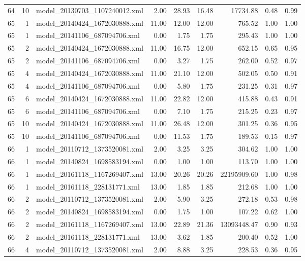 \begin{table}[ht]
\begin{tabular}{rrlrrrrrr}
   64 &  10 & model\_20130703\_1107240012.xml & 2.00 & 28.93 & 16.48 & 17734.88 & 0.48 & 0.99 \\ 
   65 &   1 & model\_20140424\_1672030888.xml & 11.00 & 12.00 & 12.00 & 765.52 & 1.00 & 1.00 \\ 
   65 &   1 & model\_20141106\_687094706.xml & 0.00 & 1.75 & 1.75 & 295.43 & 1.00 & 1.00 \\ 
   65 &   2 & model\_20140424\_1672030888.xml & 11.00 & 16.75 & 12.00 & 652.15 & 0.65 & 0.95 \\ 
   65 &   2 & model\_20141106\_687094706.xml & 0.00 & 3.27 & 1.75 & 262.00 & 0.52 & 0.97 \\ 
   65 &   4 & model\_20140424\_1672030888.xml & 11.00 & 21.10 & 12.00 & 502.05 & 0.50 & 0.91 \\ 
   65 &   4 & model\_20141106\_687094706.xml & 0.00 & 5.80 & 1.75 & 231.25 & 0.31 & 0.97 \\ 
   65 &   6 & model\_20140424\_1672030888.xml & 11.00 & 22.82 & 12.00 & 415.88 & 0.43 & 0.91 \\ 
   65 &   6 & model\_20141106\_687094706.xml & 0.00 & 7.10 & 1.75 & 215.25 & 0.23 & 0.97 \\ 
   65 &  10 & model\_20140424\_1672030888.xml & 11.00 & 26.48 & 12.00 & 301.25 & 0.36 & 0.95 \\ 
   65 &  10 & model\_20141106\_687094706.xml & 0.00 & 11.53 & 1.75 & 189.53 & 0.15 & 0.97 \\ 
   66 &   1 & model\_20110712\_1373520081.xml & 2.00 & 3.25 & 3.25 & 304.62 & 1.00 & 1.00 \\ 
   66 &   1 & model\_20140824\_1698583194.xml & 0.00 & 1.00 & 1.00 & 113.70 & 1.00 & 1.00 \\ 
   66 &   1 & model\_20161118\_1167269407.xml & 13.00 & 20.26 & 20.26 & 22195909.60 & 1.00 & 0.98 \\ 
   66 &   1 & model\_20161118\_228131771.xml & 13.00 & 1.85 & 1.85 & 212.68 & 1.00 & 1.00 \\ 
   66 &   2 & model\_20110712\_1373520081.xml & 2.00 & 5.90 & 3.25 & 272.18 & 0.53 & 0.98 \\ 
   66 &   2 & model\_20140824\_1698583194.xml & 0.00 & 1.75 & 1.00 & 107.22 & 0.62 & 1.00 \\ 
   66 &   2 & model\_20161118\_1167269407.xml & 13.00 & 22.89 & 21.36 & 13093448.47 & 0.90 & 0.93 \\ 
   66 &   2 & model\_20161118\_228131771.xml & 13.00 & 3.62 & 1.85 & 200.40 & 0.52 & 1.00 \\ 
   66 &   4 & model\_20110712\_1373520081.xml & 2.00 & 8.88 & 3.25 & 228.53 & 0.36 & 0.95 \\ 

\end{tabular}
\end{table}

